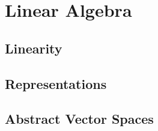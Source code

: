 \chapter{Linear Algebra}\label{ch:linearity}
\section{Linearity}
\section{Representations}
\section{Abstract Vector Spaces}

